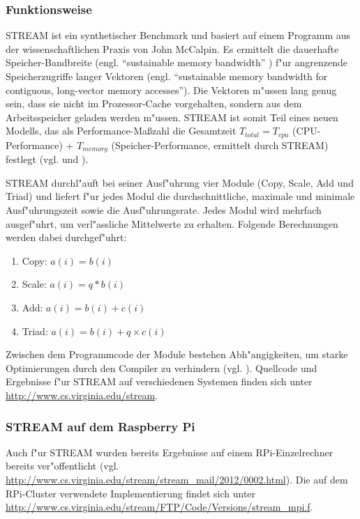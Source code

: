 \subsubsection{Funktionsweise}\label{Funktion-STREAM}

STREAM ist ein synthetischer Benchmark und basiert auf einem Programm aus der wissenschaftlichen Praxis von John McCalpin. Es ermittelt die dauerhafte Speicher-Bandbreite (engl. "`sustainable memory bandwidth"' \cite{mcc95}) f"ur angrenzende Speicherzugriffe langer Vektoren (engl. "`sustainable memory bandwidth for contiguous, long-vector memory accesses"'\cite{mcc95}). Die Vektoren m"ussen lang genug sein, dass sie nicht im Prozessor-Cache vorgehalten, sondern aus dem Arbeitsspeicher geladen werden m"ussen. STREAM ist somit Teil eines neuen Modells, das als Performance-Ma\ss zahl die Gesamtzeit $T_{total} = T_{cpu}$ (CPU-Performance) + $T_{memory}$ (Speicher-Performance, ermittelt durch STREAM) festlegt (vgl. \cite{mcc95} und \cite{mcc05}). 

STREAM durchl"auft bei seiner Ausf"uhrung vier Module (Copy, Scale, Add und Triad) und liefert f"ur jedes Modul die durchschnittliche, maximale und minimale Ausf"uhrungszeit sowie die Ausf"uhrungsrate. Jedes Modul wird mehrfach ausgef"uhrt, um verl"assliche Mittelwerte zu erhalten. Folgende Berechnungen werden dabei durchgef"uhrt: 
\begin{enumerate}
	\item Copy: $a(i) = b(i)$
    \item Scale: $a(i) = q\ast b(i)$
    \item Add: $a(i) = b(i) + c(i)$
    \item Triad: $a(i) = b(i) + q\times c(i)$
\end{enumerate}
Zwischen dem Programmcode der Module bestehen Abh"angigkeiten, um starke Optimierungen durch den Compiler zu verhindern (vgl. \cite{mcc05}). Quellcode und Ergebnisse f"ur STREAM auf verschiedenen Systemen finden sich unter \url{http://www.cs.virginia.edu/stream}.   

\subsubsection{STREAM auf dem Raspberry Pi}\label{STREAM-RPi}

Auch f"ur STREAM wurden bereits Ergebnisse auf einem RPi-Einzelrechner bereits ver"offentlicht (vgl. \url{http://www.cs.virginia.edu/stream/stream_mail/2012/0002.html}). Die auf dem RPi-Cluster verwendete Implementierung findet sich unter \url{http://www.cs.virginia.edu/stream/FTP/Code/Versions/stream_mpi.f}.  

